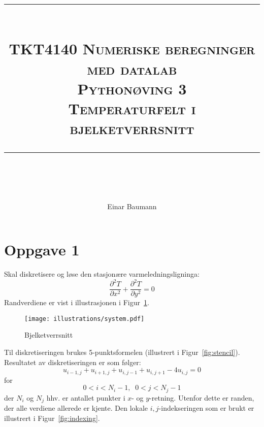 




\author{Einar Baumann}
\title{
    \vspace{-1in}
    \vspace{0.1in}
    \rule{\textwidth}{0.5pt} \\[0.5cm]
    \normalfont \normalsize \textsc{TKT4140 Numeriske beregninger med datalab} \\ [20pt]
    {\textsc{ \huge Pythonøving 3 }} \\ [0.5cm]
    {\textsc {\Large Temperaturfelt i bjelketverrsnitt} } \\
    \vspace{0.1in}
    \rule{\textwidth}{2pt} \\[0.7cm]
}


\maketitle
\thispagestyle{empty}
\clearpage

\section*{Oppgave 1}
Skal diskretisere og løse den stasjonære varmeledningsligninga:
\begin{equation}
  \frac{\partial^2 T}{\partial x^2} + \frac{\partial^2 T}{\partial y^2} = 0
\end{equation}
Randverdiene er vist i illustrasjonen i Figur~\ref{fig:system}.

\begin{figure}[htbp]
  \centering
  \texttt{[image: illustrations/system.pdf]}
  \caption{Bjelketverrsnitt}
  \label{fig:system}
\end{figure}

Til diskretiseringen brukes 5-punktsformelen (illustrert i Figur~\ref{fig:stencil}). Resultatet av diskretiseringen er som følger:
\begin{equation}
  u_{i-1,j} + u_{i+1,j} + u_{i,j-1} + u_{i,j+1} - 4u_{i,j} = 0
\end{equation}
for
\begin{equation}
\nonumber
  0<i<N_i-1,\;\; 0<j<N_j-1
\end{equation}
der $N_i$ og $N_j$ hhv. er antallet punkter i $x$- og $y$-retning. Utenfor dette er randen, der alle verdiene allerede er kjente. Den lokale $i,j$-indekseringen som er brukt er illustrert i Figur~\ref{fig:indexing}.

